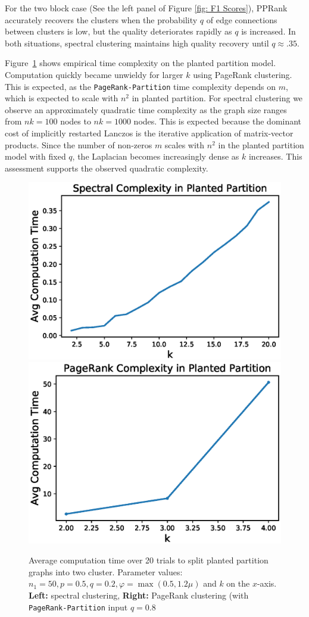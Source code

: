 \documentclass[11pt]{article}
\begin{document}
For the two block case (See the left panel of Figure \ref{fig: F1 Scores}), PPRank accurately recovers the clusters when the probability $q$ of edge connections between clusters is low, but the quality deteriorates rapidly as $q$ is increased. In both situations, spectral clustering maintains high quality recovery until $q\approx .35$.

Figure~\ref{fig:compute_time_pp} shows empirical time complexity on the planted partition model. Computation quickly became unwieldy for larger $k$ using PageRank clustering. This is expected, as the {\tt PageRank-Partition} time complexity depends on $m$, which is expected to scale with $n^2$ in planted partition. For spectral clustering we observe an approximately quadratic time complexity as the graph size ranges from $nk=100$ nodes to $nk=1000$ nodes. This is expected because the dominant cost of implicitly restarted Lanczos is the iterative application of matrix-vector products. Since the number of non-zeros $m$ scales with $n^2$ in the planted partition model with fixed $q$, the Laplacian becomes increasingly dense as $k$ increases. This assessment supports the observed quadratic complexity.

\begin{figure}
\includegraphics[width=.5\textwidth]{planted_partition_compute_time_spec.eps}
\includegraphics[width=.5\textwidth]{planted_partition_compute_time_pr.eps}
\caption{Average computation time over 20 trials to split planted partition graphs into two cluster. Parameter values: $n_1=50,p=0.5,q=0.2,\varphi=\max(0.5, 1.2\mu)$ and $k$ on the $x$-axis. \textbf{Left:} spectral clustering, \textbf{Right:} PageRank clustering (with {\tt PageRank-Partition} input $q=0.8$}\label{fig:compute_time_pp}
\end{figure}
\end{document}
